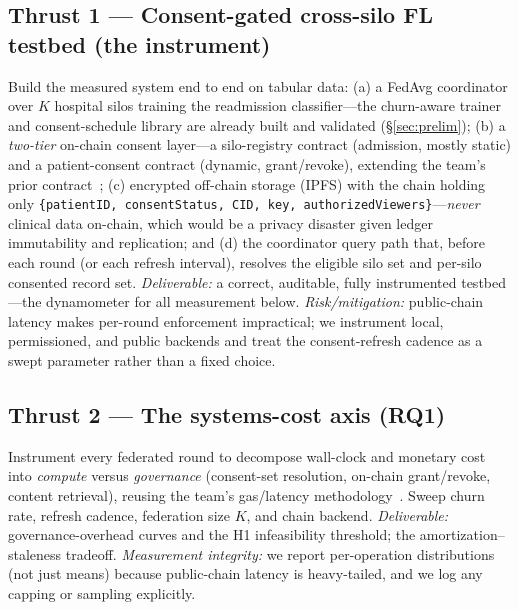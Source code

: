 \documentclass[11pt]{article}
\begin{document}
\subsection{Thrust 1 --- Consent-gated cross-silo FL testbed (the instrument)}
Build the measured system end to end on tabular data: (a) a FedAvg coordinator
over $K$ hospital silos training the readmission classifier---the churn-aware
trainer and consent-schedule library are already built and validated
(\S\ref{sec:prelim}); (b) a
\emph{two-tier} on-chain consent layer---a silo-registry contract (admission,
mostly static) and a patient-consent contract (dynamic, grant/revoke), extending
the team's prior contract~\cite{ehr}; (c) encrypted off-chain storage (IPFS) with
the chain holding only \texttt{\{patientID, consentStatus, CID, key,
authorizedViewers\}}---\emph{never} clinical data on-chain, which would be a
privacy disaster given ledger immutability and replication; and (d) the
coordinator query path that, before each round (or each refresh interval),
resolves the eligible silo set and per-silo consented record set. \emph{Deliverable:}
a correct, auditable, fully instrumented testbed---the dynamometer for all
measurement below. \emph{Risk/mitigation:} public-chain latency makes per-round
enforcement impractical; we instrument local, permissioned, and public backends
and treat the consent-refresh cadence as a swept parameter rather than a fixed
choice.

\subsection{Thrust 2 --- The systems-cost axis (RQ1)}
Instrument every federated round to decompose wall-clock and monetary cost into
\emph{compute} versus \emph{governance} (consent-set resolution, on-chain
grant/revoke, content retrieval), reusing the team's gas/latency methodology~\cite{ehr}.
Sweep churn rate, refresh cadence, federation size $K$, and chain backend.
\emph{Deliverable:} governance-overhead curves and the H1 infeasibility
threshold; the amortization--staleness tradeoff. \emph{Measurement integrity:} we
report per-operation distributions (not just means) because public-chain latency
is heavy-tailed, and we log any capping or sampling explicitly.
\end{document}
